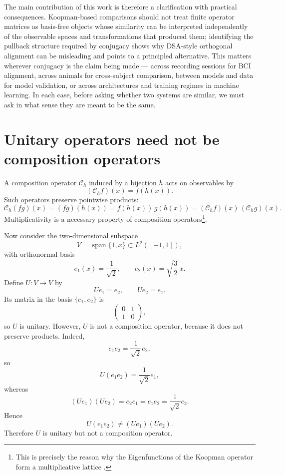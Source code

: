 \documentclass{article}
\theoremstyle{definition}
\begin{document}
The main contribution of this work is therefore a clarification with practical consequences. Koopman-based comparisons should not treat finite operator matrices as basis-free objects whose similarity can be interpreted independently of the observable spaces and transformations that produced them; identifying the pullback structure required by conjugacy shows why DSA-style orthogonal alignment can be misleading and points to a principled alternative. This matters wherever conjugacy is the claim being made — across recording sessions for BCI alignment, across animals for cross-subject comparison, between models and data for model validation, or across architectures and training regimes in machine learning. In each case, before asking whether two systems are similar, we must ask in what sense they are meant to be the same.





\newpage
\appendix

\section{Unitary operators need not be composition operators}
\label{app:unitary_not_composition}

A composition operator \(\mathcal C_h\) induced by a bijection \(h\) acts on observables by
\[
(\mathcal C_h f)(x)=f(h(x)).
\]
Such operators preserve pointwise products:
\begin{equation}
\mathcal C_h(fg)(x)
=(fg)(h(x))
=f(h(x))\,g(h(x))
=(\mathcal C_h f)(x)\,(\mathcal C_h g)(x).
\label{eq:composition_preserves_products}
\end{equation}
Multiplicativity is a necessary property of composition operators\footnote{ This is precisely the reason why the Eigenfunctions of the Koopman operator form a multiplicative lattice \citep{budivsic2012applied}.}. 

Now consider the two-dimensional subspace
\[
V=\operatorname{span}\{1,x\}\subset L^2([-1,1]),
\]
with orthonormal basis
\[
e_1(x)=\frac{1}{\sqrt{2}},\qquad e_2(x)=\sqrt{\frac{3}{2}}\,x.
\]
Define \(U:V\to V\) by
\[
Ue_1=e_2,\qquad Ue_2=e_1.
\]
Its matrix in the basis \(\{e_1,e_2\}\) is
\[
\begin{pmatrix}
0 & 1\\
1 & 0
\end{pmatrix},
\]
so \(U\) is unitary. However, \(U\) is not a composition operator, because it does not preserve products. Indeed,
\[
e_1e_2=\frac{1}{\sqrt{2}}e_2,
\]
so
\[
U(e_1e_2)=\frac{1}{\sqrt{2}}e_1,
\]
whereas
\[
(Ue_1)(Ue_2)=e_2e_1=e_1e_2=\frac{1}{\sqrt{2}}e_2.
\]
Hence
\[
U(e_1e_2)\neq (Ue_1)(Ue_2).
\]
Therefore \(U\) is unitary but not a composition operator. 
\end{document}
